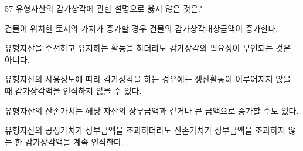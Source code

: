 \begin{question}{57}
유형자산의 감가상각에 관한 설명으로 옳지 않은 것은?
\begin{choices}
  \item 건물이 위치한 토지의 가치가 증가할 경우 건물의 감가상각대상금액이 증가한다.
  \item 유형자산을 수선하고 유지하는 활동을 하더라도 감가상각의 필요성이 부인되는 것은 아니다.
  \item 유형자산의 사용정도에 따라 감가상각을 하는 경우에는 생산활동이 이루어지지 않을 때 감가상각액을 인식하지 않을 수 있다.
  \item 유형자산의 잔존가치는 해당 자산의 장부금액과 같거나 큰 금액으로 증가할 수도 있다.
  \item 유형자산의 공정가치가 장부금액을 초과하더라도 잔존가치가 장부금액을 초과하지 않는 한 감가상각액을 계속 인식한다.
\end{choices}
\end{question}
